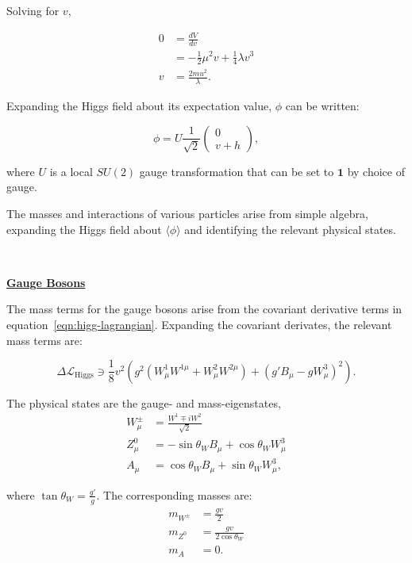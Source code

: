 Solving for $v$,

\begin{align}
	0 &= \frac{dV}{dv}\\
	&= -\frac12\mu^2 v + \frac14\lambda v^3 \\
	v &= \frac{2mu^2}{\lambda}.
\end{align}

Expanding the Higgs field about its expectation value, $\phi$ can be written:

\begin{equation}
	\phi = U \frac{1}{\sqrt{2}} \left(\begin{array}{c} 0 \\ v+h \end{array}\right),
\end{equation}

where $U$ is a local $SU(2)$ gauge transformation that can be set to $\mathbf{1}$ by choice of gauge. 

The masses and interactions of various particles arise from simple algebra, expanding the Higgs field about $\langle \phi \rangle$ and identifying the relevant physical states.

\ 

\underline{\textbf{Gauge Bosons}}

The mass terms for the gauge bosons arise from the covariant derivative terms in equation~\ref{eqn:higg-lagrangian}. Expanding the covariant derivates, the relevant mass terms are:

\begin{equation}
	\Delta\mathcal{L}_{\mathrm{Higgs}} \ni \frac{1}{8} v^2 \left( g^2 (W^1_{\mu}W^{1\mu} + W^2_{\mu}W^{2\mu}) + (g'B_{\mu} - gW^3_{\mu})^2 \right).
\end{equation}

The physical states are the gauge- and mass-eigenstates,
\begin{align}
	W^{\pm}_{\mu} &= \frac{W^1 \mp iW^2}{\sqrt{2}} \\
	Z^0_{\mu} &= -\sin\theta_W B_{\mu} + \cos\theta_W W_{\mu}^3 \\
	A_{\mu} &= \cos\theta_W B_{\mu} + \sin\theta_W W_{\mu}^3,
\end{align}

where $\tan\theta_W = \frac{g'}{g}$. The corresponding masses are:
\begin{align}
	m_{W^{\pm}} &= \frac{gv}{2} \\
	m_{Z^0} &= \frac{gv}{2\cos\theta_W} \\
	m_{A} &= 0.
\end{align}


